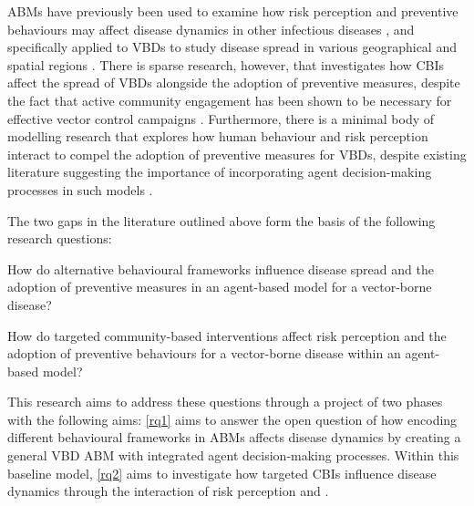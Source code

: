 ABMs have previously been used to examine how risk perception and preventive behaviours may affect disease dynamics in other infectious diseases \cite{abdulkareem_risk_2020, mao_modeling_2014, kandiah_empirical_2017, du_how_2021, tully_coevolution_2013, andrews_disease_2015}, and specifically applied to VBDs to study disease spread in various geographical and spatial regions \cite{krzhizhanovskaya_agent-based_2020, selvaraj_vector_2020, manore_network-patch_2015, linard_multi-agent_2009, jacintho_agent-based_2010, perkins_agent-based_2019, mulyani_agent_2017, maneerat_spatial_2016}. There is sparse research, however, that investigates how CBIs affect the spread of VBDs alongside the adoption of preventive measures, despite the fact that active community engagement has been shown to be necessary for effective vector control campaigns \cite{winch_effectiveness_1992, rivera_adoption_2023}. Furthermore, there is a minimal body of modelling research that explores how human behaviour and risk perception interact to compel the adoption of preventive measures for VBDs, despite existing literature suggesting the importance of incorporating agent decision-making processes in such models \cite{scheidegger_agent-based_2017, mateus_c_modeling_2021}.


The two gaps in the literature outlined above form the basis of the following research questions:

\begin{questions}

\item How do alternative behavioural frameworks influence disease spread and the adoption of preventive measures in an agent-based model for a vector-borne disease?\label{rq1}

\item How do targeted community-based interventions affect risk perception and the  adoption of preventive behaviours for a vector-borne disease within an agent-based model?\label{rq2}

\end{questions}

This research aims to address these questions through a project of two phases with the following aims: \ref{rq1} aims to answer the open question of how encoding different behavioural frameworks in ABMs affects disease dynamics by creating a general VBD ABM with integrated agent decision-making processes. Within this baseline model, \ref{rq2} aims to investigate how targeted CBIs influence disease dynamics through the interaction of risk perception and .


